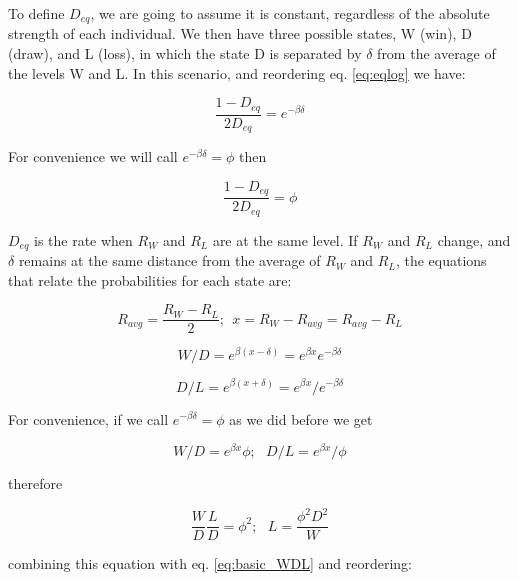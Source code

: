 \documentclass[12pt]{article}
\begin{document}
To define $D_{eq}$, we are going to assume it is constant, regardless of the absolute strength of each individual.
We then have three possible states, W (win), D (draw), and L (loss), in which the state D is separated by $\delta$ from the average of the levels W and L.
In this scenario, and reordering eq. \ref{eq:eqlog} we have:

	\begin{equation} \label{eq:deq0}
	\frac{1-D_{eq}}{2 D_{eq}} = e^{-\beta \delta}
	\end{equation}

For convenience we will call $e^{-\beta \delta} = \phi$ then

	\begin{equation} \label{eq:deq0b}
	\frac{1-D_{eq}}{2 D_{eq}} = \phi
	\end{equation}

$D_{eq}$ is the rate when $R_{W}$ and $R_{L}$ are at the same level. 
If $R_{W}$ and $R_{L}$ change, and $\delta$ remains at the same distance from the average of $R_{W}$ and $R_{L}$, the equations that relate the probabilities for each state are:

	\begin{equation} \label{eq:deq1}
	R_{avg} = \frac{R_{W} - R_{L}}{2};\:\: x = R_{W} - R_{avg} =  R_{avg} - R_{L}
	\end{equation}

	\begin{equation} \label{eq:deq2}
	W/D = e^{\beta(x-\delta)} =  e^{\beta x} e^{-\beta \delta}
	\end{equation}

	\begin{equation} \label{eq:deq3}
	D/L = e^{\beta(x+\delta)} =  e^{\beta x} / e^{-\beta \delta}
	\end{equation}


For convenience, if we call $e^{-\beta \delta} = \phi$ as we did before we get

	\begin{equation} \label{eq:deq4}
	W/D = e^{\beta x} \phi;\:\:\:
	D/L = e^{\beta x} / \phi
	\end{equation}

therefore

	\begin{equation} \label{eq:deq_wldd}
	\frac{W}{D} \frac{L}{D} = \phi^2; \:\:\: L = \frac{\phi^2 D^2}{W}
	\end{equation}

combining this equation with eq. \ref{eq:basic_WDL} and reordering: 
\end{document}
